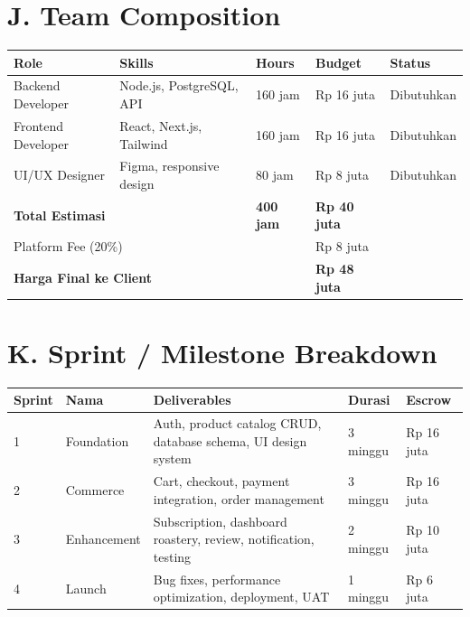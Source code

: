 \documentclass[11pt,a4paper]{article}
\begin{document}
\section{J. Team Composition}
\noindent\small
\begin{tabularx}{\textwidth}{|X|X|X|X|X|}
\hline
\centering\textbf{Role}\arraybackslash & \centering\textbf{Skills}\arraybackslash & \centering\textbf{Hours}\arraybackslash & \centering\textbf{Budget}\arraybackslash & \centering\textbf{Status}\arraybackslash \\\hline
Backend Developer & Node.js, PostgreSQL, API & 160 jam & Rp 16 juta & Dibutuhkan \\\hline
Frontend Developer & React, Next.js, Tailwind & 160 jam & Rp 16 juta & Dibutuhkan \\\hline
UI/UX Designer & Figma, responsive design & 80 jam & Rp 8 juta & Dibutuhkan \\\hline
\multicolumn{2}{|l|}{\centering\textbf{Total Estimasi}\arraybackslash} & \centering\textbf{400 jam}\arraybackslash & \centering\textbf{Rp 40 juta}\arraybackslash & \\\hline
\multicolumn{2}{|l|}{Platform Fee (20\%)} & & Rp 8 juta & \\\hline
\multicolumn{2}{|l|}{\centering\textbf{Harga Final ke Client}\arraybackslash} & & \centering\textbf{Rp 48 juta}\arraybackslash & \\\hline
\end{tabularx}\normalsize

\section{K. Sprint / Milestone Breakdown}
\noindent\small
\begin{tabularx}{\textwidth}{|X|X|X|X|X|}
\hline
\centering\textbf{Sprint}\arraybackslash & \centering\textbf{Nama}\arraybackslash & \centering\textbf{Deliverables}\arraybackslash & \centering\textbf{Durasi}\arraybackslash & \centering\textbf{Escrow}\arraybackslash \\\hline
1 & Foundation & Auth, product catalog CRUD, database schema, UI design system & 3 minggu & Rp 16 juta \\\hline
2 & Commerce & Cart, checkout, payment integration, order management & 3 minggu & Rp 16 juta \\\hline
3 & Enhancement & Subscription, dashboard roastery, review, notification, testing & 2 minggu & Rp 10 juta \\\hline
4 & Launch & Bug fixes, performance optimization, deployment, UAT & 1 minggu & Rp 6 juta \\\hline
\end{tabularx}\normalsize
\end{document}
